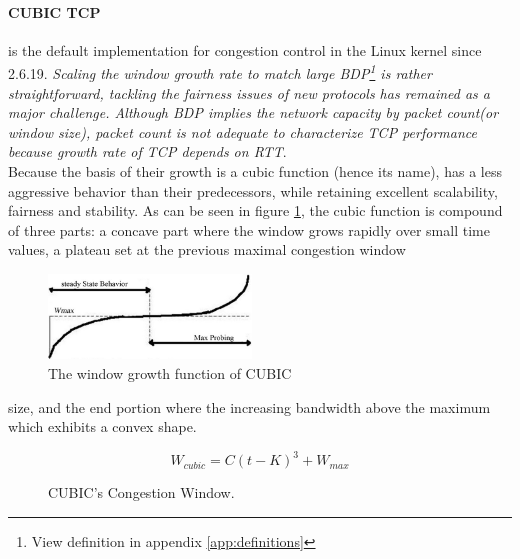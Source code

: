 \paragraph{CUBIC TCP}  is the default implementation for congestion control in
the Linux kernel since 2.6.19. \textit{Scaling the window growth rate to match
large BDP\footnote{View definition in appendix \ref{app:definitions}} is rather
straightforward, tackling the fairness issues of new protocols has remained as
a major challenge.  Although BDP implies the network capacity by packet
count(or window size), packet count is not adequate to characterize TCP
performance because growth rate of TCP depends on RTT}\cite{HaCubic}.\\

Because the basis of their growth is a cubic function (hence its name), has a
less aggressive behavior than their predecessors, while retaining excellent
scalability, fairness and stability. As can be seen in figure
\ref{fig:cubicfunc}, the cubic function is compound of three parts: a concave
part where the window grows rapidly over small time values, a plateau set at the previous maximal
congestion window 

\begin{figure}
\begin{center}
    \includegraphics[width=0.48\textwidth]{img/cubic}
  \end{center}
\caption{The window growth function of CUBIC}
\label{fig:cubicfunc}
\end{figure}

\noindent size, and the end portion where the increasing bandwidth
above the maximum which exhibits a convex shape.\\

\begin{figure}[h]
\begin{minipage}{6cm}
\centering
	\[ W_{cubic} = C(t - K)^3 + W_{max}\]
    \caption{CUBIC's Congestion Window.\protect\footnotemark}
    \label{fig:cubicform}
\end{minipage}%
\end{figure}%


